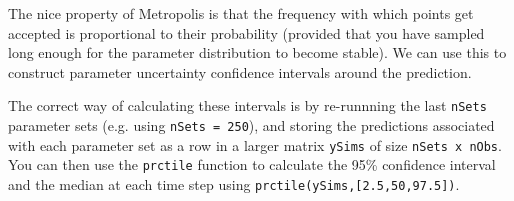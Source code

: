 
The nice property of Metropolis is that the frequency with which points get
accepted is proportional to their probability (provided that you have sampled
long enough for the parameter distribution to become stable). We can use this to
construct parameter uncertainty confidence intervals around the prediction.

The correct way of calculating these intervals is by re-runnning the last
\texttt{nSets} parameter sets (e.g. using \texttt{nSets = 250}), and storing the
predictions associated with each parameter set as a row in a larger matrix
\texttt{ySims} of size \texttt{nSets x nObs}. You can then use the
\texttt{prctile} function to calculate the 95\% confidence interval and the
median at each time step using \texttt{prctile(ySims,[2.5,50,97.5])}.



 



